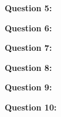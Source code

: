 \documentclass{report}
\begin{document}
    \bigbreak \noindent \bigbreak \noindent \bigbreak \noindent 
    \begin{Large}
        \textbf{Question 5:}
    \end{Large}
    \bigbreak \noindent 
    \bigbreak \noindent 

    \bigbreak \noindent \bigbreak \noindent \bigbreak \noindent 
    \begin{Large}
        \textbf{Question 6:}
    \end{Large}
    \bigbreak \noindent 
    \bigbreak \noindent 

    \bigbreak \noindent \bigbreak \noindent \bigbreak \noindent 
    \begin{Large}
        \textbf{Question 7:}
    \end{Large}
    \bigbreak \noindent 
    \bigbreak \noindent 

    \bigbreak \noindent \bigbreak \noindent \bigbreak \noindent 
    \begin{Large}
        \textbf{Question 8:}
    \end{Large}
    \bigbreak \noindent 
    \bigbreak \noindent 

    \bigbreak \noindent \bigbreak \noindent \bigbreak \noindent 
    \begin{Large}
        \textbf{Question 9:}
    \end{Large}
    \bigbreak \noindent 
    \bigbreak \noindent 

    \bigbreak \noindent \bigbreak \noindent \bigbreak \noindent 
    \begin{Large}
        \textbf{Question 10:}
    \end{Large}
    \bigbreak \noindent 
    \bigbreak \noindent 
    
\end{document}
